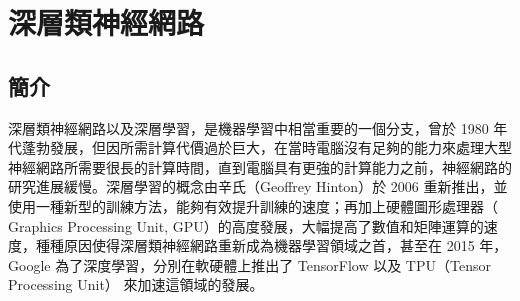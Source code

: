 \section{深層類神經網路}

\subsection{簡介}
深層類神經網路以及深層學習，是機器學習中相當重要的一個分支，曾於 1980 年代蓬勃發展，但因所需計算代價過於巨大，在當時電腦沒有足夠的能力來處理大型神經網路所需要很長的計算時間，直到電腦具有更強的計算能力之前，神經網路的研究進展緩慢。深層學習的概念由辛氏（Geoffrey Hinton）於 2006 重新推出，並使用一種新型的訓練方法，能夠有效提升訓練的速度；再加上硬體圖形處理器（ Graphics Processing Unit, GPU）的高度發展，大幅提高了數值和矩陣運算的速度，種種原因使得深層類神經網路重新成為機器學習領域之首，甚至在 2015 年， Google 為了深度學習，分別在軟硬體上推出了 TensorFlow \cite{tensorflow2015-whitepaper} 以及 TPU（Tensor Processing Unit） \cite{jouppi2017datacenter} 來加速這領域的發展。

